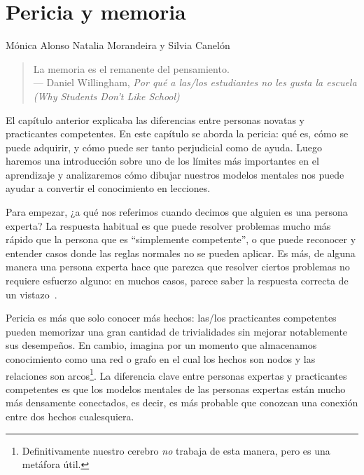 \chapter{Pericia y memoria}\label{s:memory}

\begin{reviewer}
{Mónica Alonso}
{Natalia Morandeira y Silvia Canelón}
\end{reviewer}

\begin{quote}

  La memoria es el remanente del pensamiento. \\
  --- Daniel Willingham, \emph{Por qué a las/los estudiantes no les gusta la escuela (Why Students Don't Like School)}

\end{quote}

El capítulo anterior explicaba las diferencias entre personas novatas y practicantes competentes.
En este capítulo se aborda la pericia:
qué es,
cómo se puede adquirir,
y cómo puede ser tanto perjudicial como de ayuda.
Luego haremos una introducción sobre uno de los límites más importantes en el aprendizaje
y analizaremos cómo dibujar nuestros modelos mentales nos puede ayudar a convertir el conocimiento en lecciones.

Para empezar,
¿a qué nos referimos cuando decimos que alguien es una persona experta?
La respuesta habitual es que puede resolver problemas mucho más rápido que la persona que es ``simplemente competente'',
o que puede reconocer y entender casos donde las reglas normales no se pueden aplicar.
Es más, de alguna manera una persona experta hace que parezca que resolver ciertos problemas no requiere esfuerzo alguno:
en muchos casos,
parece saber la respuesta correcta de un vistazo~\cite{Parn2017}.

Pericia es más que solo conocer más hechos:
las/los practicantes competentes pueden memorizar una gran cantidad de trivialidades sin  mejorar notablemente sus desempeños.
En cambio,
imagina por un momento que almacenamos conocimiento como una red o grafo en el cual los hechos son nodos
y las relaciones son arcos\footnote{Definitivamente nuestro cerebro \emph{no} trabaja de esta manera, pero es una metáfora útil.}.
La diferencia clave entre personas expertas y practicantes competentes es que
los modelos mentales de las personas expertas están mucho más densamente conectados, 
es decir, es más probable que conozcan una conexión entre dos hechos cualesquiera.

